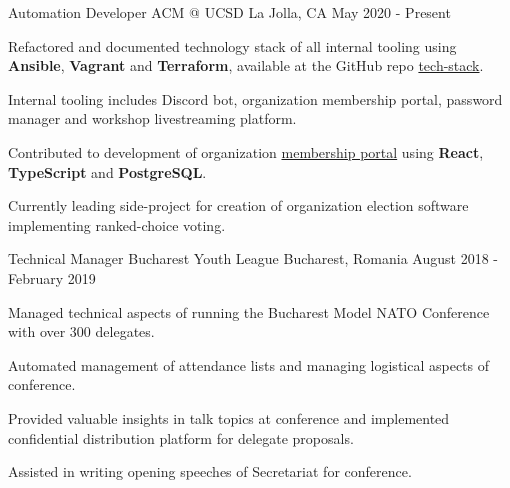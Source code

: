 
\begin{cventries}
  \cventry
    {Automation Developer}
    {ACM @ UCSD}
    {La Jolla, CA}
    {May 2020 - Present}
    {
      \begin{cvitems}
        \item {Refactored and documented technology stack of all internal tooling using \textbf{Ansible}, \textbf{Vagrant} and \textbf{Terraform}, available at the GitHub repo \href{https://github.com/acmucsd/tech-stack}{tech-stack}.}
        \item {Internal tooling includes Discord bot, organization membership portal, password manager and workshop livestreaming platform.}
        \item {Contributed to development of organization \href{https://github.com/acmucsd/membership-portal-ui}{membership portal} using \textbf{React}, \textbf{TypeScript} and \textbf{PostgreSQL}.}
        \item {Currently leading side-project for creation of organization election software implementing ranked-choice voting.}
      \end{cvitems}
    }
  \cventry
    {Technical Manager}
    {Bucharest Youth League}
    {Bucharest, Romania}
    {August 2018 - February 2019}
    {
      \begin{cvitems}
        \item {Managed technical aspects of running the Bucharest Model NATO Conference with over 300 delegates.}
        \item {Automated management of attendance lists and managing logistical aspects of conference.}
        \item {Provided valuable insights in talk topics at conference and implemented confidential distribution platform for delegate proposals.}
        \item {Assisted in writing opening speeches of Secretariat for conference.}
      \end{cvitems}
    }
\end{cventries}
